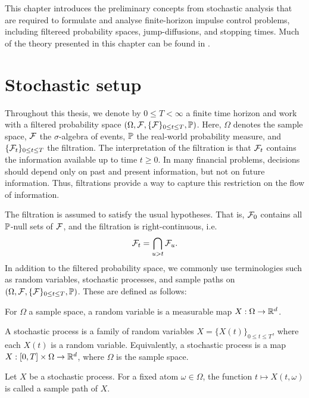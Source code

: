 \label{section: Preliminaries}
This chapter introduces the preliminary concepts from stochastic analysis that are required to formulate and analyse finite-horizon impulse control problems, including filtereed probability spaces, jump-diffusions, and stopping times. Much of the theory presented in this chapter can be found in \cite{applebaum2009levy, jarrow2018continuous, oksendal2007applied}.

\section{Stochastic setup}
\label{section: stochastic setup}
Throughout this thesis, we denote by $0\leq T<\infty$ a finite time horizon and work with a filtered probability space $(\Omega, \mathcal{F}, \{\mathcal{F}\}_{0 \leq t \leq T}, \mathbb{P})$. Here, $\Omega$ denotes the sample space, $\mathcal{F}$ the $\sigma$-algebra of events, $\mathbb{P}$ the real-world probability measure, and $\{\mathcal{F}_t\}_{0 \leq t \leq T}$ the filtration. The interpretation of the filtration is that $\mathcal{F}_t$ contains the information available up to time $t\geq 0$. In many financial problems, decisions should depend only on past and present information, but not on future information. Thus, filtrations provide a way to capture this restriction on the flow of information.

The filtration is assumed to satisfy the usual hypotheses. That is, $\mathcal{F}_0$ contains all $\mathbb{P}$-null sets of $\mathcal{F}$, and the filtration is right-continuous, i.e.
\begin{equation*}
    \mathcal{F}_t = \bigcap_{u>t}\mathcal{F}_u.
\end{equation*}
In addition to the filtered probability space, we commonly use terminologies such as random variables, stochastic processes, and sample paths on $(\Omega, \mathcal{F}, \{\mathcal{F}\}_{0 \leq t \leq T}, \mathbb{P})$. These are defined as follows:
\begin{definition}
    For $\Omega$ a sample space, a random variable is a measurable map $X: \Omega \rightarrow \mathbb{R}^d$. 
\end{definition}
\begin{definition}
    A stochastic process is a family of random variables $X=\{X(t)\}_{0 \leq t \leq T}$, where each $X(t)$ is a random variable. Equivalently, a stochastic process is a map $X: [0,T]\times\Omega \rightarrow \mathbb{R}^d$, where $\Omega$ is the sample space.
\end{definition}
\begin{definition}
    Let $X$ be a stochastic process. For a fixed atom $\omega \in \Omega$, the function $t \mapsto X(t,\omega)$ is called a sample path of $X$. 
\end{definition}


